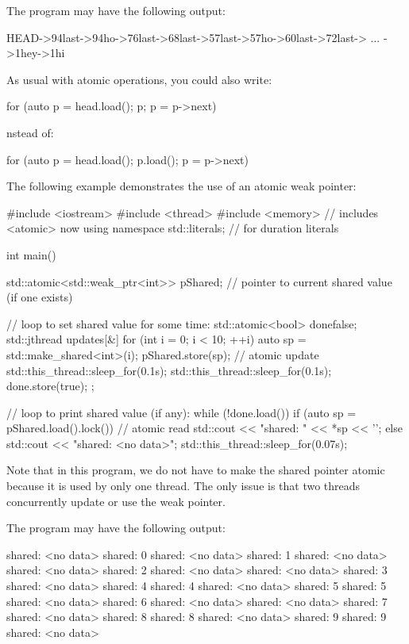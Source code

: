 The program may have the following output:

\begin{shell}
HEAD->94last->94ho->76last->68last->57last->57ho->60last->72last-> ... ->1hey->1hi
\end{shell}

As usual with atomic operations, you could also write:

\begin{cpp}
for (auto p = head.load(); p; p = p->next)
\end{cpp}

nstead of:

\begin{cpp}
for (auto p = head.load(); p.load(); p = p->next)
\end{cpp}


The following example demonstrates the use of an atomic weak pointer:


\begin{cpp}
#include <iostream>
#include <thread>
#include <memory> // includes <atomic> now
using namespace std::literals; // for duration literals

int main()
{
	std::atomic<std::weak_ptr<int>> pShared; // pointer to current shared value (if one exists)
	
	// loop to set shared value for some time:
	std::atomic<bool> done{false};
	std::jthread updates{[&] {
							for (int i = 0; i < 10; ++i) {
								{
									auto sp = std::make_shared<int>(i);
									pShared.store(sp); // atomic update
									std::this_thread::sleep_for(0.1s);
								}
								std::this_thread::sleep_for(0.1s);
							}
							done.store(true);
					}};
				
	// loop to print shared value (if any):
	while (!done.load()) {
		if (auto sp = pShared.load().lock()) { // atomic read
			std::cout << "shared: " << *sp << '\n';
		}
		else {
			std::cout << "shared: <no data>\n";
		}
		std::this_thread::sleep_for(0.07s);
	}
}
\end{cpp}

Note that in this program, we do not have to make the shared pointer atomic because it is used by only one thread. The only issue is that two threads concurrently update or use the weak pointer.

The program may have the following output:

\begin{shell}
shared: <no data>
shared: 0
shared: <no data>
shared: 1
shared: <no data>
shared: <no data>
shared: 2
shared: <no data>
shared: <no data>
shared: 3
shared: <no data>
shared: 4
shared: 4
shared: <no data>
shared: 5
shared: 5
shared: <no data>
shared: 6
shared: <no data>
shared: <no data>
shared: 7
shared: <no data>
shared: 8
shared: 8
shared: <no data>
shared: 9
shared: 9
shared: <no data>
\end{shell}

